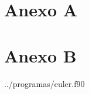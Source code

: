 \documentclass[
		12pt,            %
		a4paper
	      ]  
	      {article}          %
\renewcommand{\baselinestretch}{1.5} %
\begin{document}
	\cleardoublepage
	\renewcommand{\baselinestretch}{1.5} %
	\nocite{*}
	
	 

	\cleardoublepage
	\section*{Anexo A}
	\renewcommand{\lstlistingname}{Listagem}

	\renewcommand{\baselinestretch}{1.0} %
	

	\cleardoublepage
	\section*{Anexo B}
	
		        {../programas/euler.f90}
	
	\cleardoublepage
	
\end{document}
